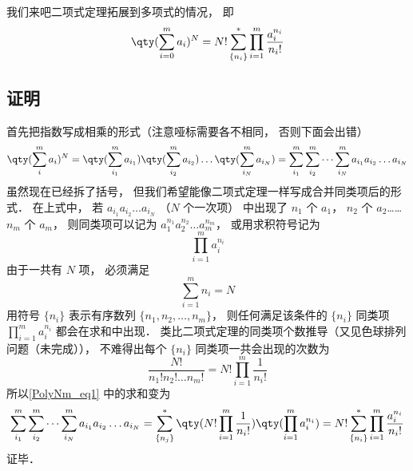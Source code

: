 

我们来吧二项式定理拓展到多项式的情况， 即
\begin{equation}
\qty(\sum_{i = 0}^m a_i)^N = N! \sum_{\{n_i\}}^* \prod_{i = 1}^m \frac{a_i^{n_i}}{n_i!}
\end{equation}

\subsection{证明}
首先把指数写成相乘的形式（注意哑标需要各不相同， 否则下面会出错）
\begin{equation}\label{PolyNm_eq1}
\qty(\sum_i^m a_i)^N = \qty(\sum_{i_1}^m a_{i_1})\qty(\sum_{i_2}^m a_{i_2})\dots \qty(\sum_{i_N}^m a_{i_N}) = \sum_{i_1}^m \sum_{i_2}^m\dots \sum_{i_N}^m a_{i_1} a_{i_2}\dots a_{i_N}
\end{equation}
虽然现在已经拆了括号， 但我们希望能像二项式定理一样写成合并同类项后的形式． 在上式中， 若 $a_{i_1} a_{i_2}\dots a_{i_N}$ （$N$ 个一次项） 中出现了 $n_1$ 个 $a_1$， $n_2$ 个 $a_2$…… $n_m$ 个 $a_m$， 则同类项可以记为 $a_1^{n_1} a_2^{n_2} \dots a_m^{n_m}$， 或用求积符号记为
\begin{equation}
\prod_{i=1}^m a_i^{n_i}
\end{equation}
由于一共有 $N$ 项， 必须满足
\begin{equation}
\sum_{i=1}^m n_i = N
\end{equation}
用符号 $\{n_i\}$ 表示有序数列 $\{n_1,n_2,\dots, n_m\}$， 则任何满足该条件的 $\{n_i\}$ 同类项 $\prod_{i=1}^m a_i^{n_i}$ 都会在求和中出现． 类比二项式定理的同类项个数推导（又见色球排列问题（未完成））， 不难得出每个 $\{n_i\}$ 同类项一共会出现的次数为
\begin{equation}
\frac{N!}{n_1! n_2!\dots n_m!} = N! \prod_{i=1}^m \frac{1}{n_i!}
\end{equation}
所以\autoref{PolyNm_eq1} 中的求和变为
\begin{equation}
\sum_{i_1}^m \sum_{i_2}^m\dots \sum_{i_N}^m a_{i_1} a_{i_2}\dots a_{i_N}
= \sum_{\{n_j\}}^* \qty(N! \prod_{i=1}^m \frac{1}{n_i!}) \qty(\prod_{i=1}^m a_i^{n_i})
= N! \sum_{\{n_i\}}^* \prod_{i=1}^m \frac{a_i^{n_i}}{n_i!}
\end{equation}
证毕．
